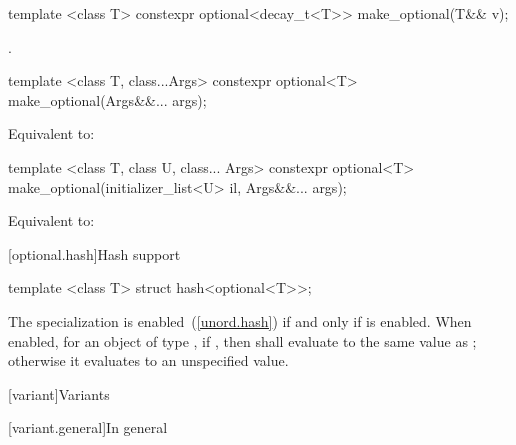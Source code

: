 %
\begin{itemdecl}
template <class T> constexpr optional<decay_t<T>> make_optional(T&& v);
\end{itemdecl}

\begin{itemdescr}
\pnum
\returns
{}.
\end{itemdescr}

%
\begin{itemdecl}
template <class T, class...Args>
  constexpr optional<T> make_optional(Args&&... args);
\end{itemdecl}

\begin{itemdescr}
\pnum
\effects Equivalent to: 
\end{itemdescr}

%
\begin{itemdecl}
template <class T, class U, class... Args>
  constexpr optional<T> make_optional(initializer_list<U> il, Args&&... args);
\end{itemdecl}

\begin{itemdescr}
\pnum
\effects Equivalent to: 
\end{itemdescr}

[optional.hash]{Hash support}

%
\begin{itemdecl}
template <class T> struct hash<optional<T>>;
\end{itemdecl}

\begin{itemdescr}
\pnum
The specialization  is enabled~(\ref{unord.hash})
if and only if  is enabled.
When enabled, for an object  of type ,
if , then 
shall evaluate to the same value as ;
otherwise it evaluates to an unspecified value.
\end{itemdescr}


[variant]{Variants}

[variant.general]{In general}

